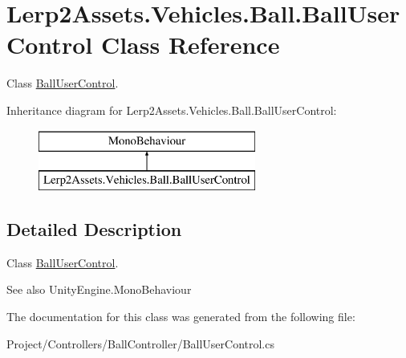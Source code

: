 \hypertarget{class_lerp2_assets_1_1_vehicles_1_1_ball_1_1_ball_user_control}{}\section{Lerp2\+Assets.\+Vehicles.\+Ball.\+Ball\+User\+Control Class Reference}
\label{class_lerp2_assets_1_1_vehicles_1_1_ball_1_1_ball_user_control}


Class \hyperlink{class_lerp2_assets_1_1_vehicles_1_1_ball_1_1_ball_user_control}{Ball\+User\+Control}.  


Inheritance diagram for Lerp2\+Assets.\+Vehicles.\+Ball.\+Ball\+User\+Control\+:\begin{figure}[H]
\begin{center}
\leavevmode
\includegraphics[height=2.000000cm]{class_lerp2_assets_1_1_vehicles_1_1_ball_1_1_ball_user_control}
\end{center}
\end{figure}


\subsection{Detailed Description}
Class \hyperlink{class_lerp2_assets_1_1_vehicles_1_1_ball_1_1_ball_user_control}{Ball\+User\+Control}. 

\begin{DoxySeeAlso}{See also}
Unity\+Engine.\+Mono\+Behaviour


\end{DoxySeeAlso}


The documentation for this class was generated from the following file\+:\begin{DoxyCompactItemize}
\item 
Project/\+Controllers/\+Ball\+Controller/Ball\+User\+Control.\+cs\end{DoxyCompactItemize}
